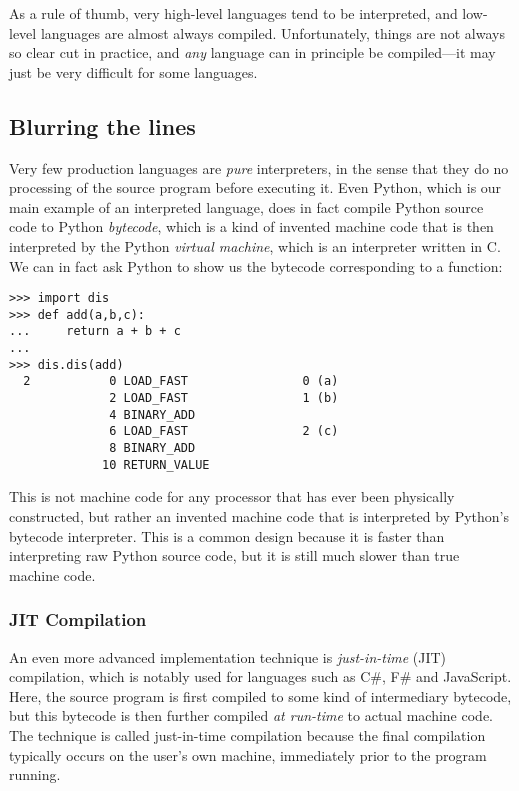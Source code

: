 As a rule of thumb, very high-level languages tend to be interpreted,
and low-level languages are almost always compiled.  Unfortunately,
things are not always so clear cut in practice, and \textit{any}
language can in principle be compiled---it may just be very difficult
for some languages.

\subsection{Blurring the lines}

Very few production languages are \textit{pure} interpreters, in the
sense that they do no processing of the source program before
executing it.  Even Python, which is our main example of an
interpreted language, does in fact compile Python source code to
Python \textit{bytecode}, which is a kind of invented machine code
that is then interpreted by the Python \textit{virtual machine}, which
is an interpreter written in C.  We can in fact ask Python to show us
the bytecode corresponding to a function:

\begin{lstlisting}
>>> import dis
>>> def add(a,b,c):
...     return a + b + c
...
>>> dis.dis(add)
  2           0 LOAD_FAST                0 (a)
              2 LOAD_FAST                1 (b)
              4 BINARY_ADD
              6 LOAD_FAST                2 (c)
              8 BINARY_ADD
             10 RETURN_VALUE
\end{lstlisting}

This is not machine code for any processor that has ever been
physically constructed, but rather an invented machine code that is
interpreted by Python's bytecode interpreter.  This is a common design
because it is faster than interpreting raw Python source code, but it
is still much slower than true machine code.

\subsubsection{JIT Compilation}

An even more advanced implementation technique is
\textit{just-in-time} (JIT) compilation, which is notably used for
languages such as C\#, F\# and JavaScript.  Here, the source program
is first compiled to some kind of intermediary bytecode, but this
bytecode is then further compiled \textit{at run-time} to actual
machine code.  The technique is called just-in-time compilation
because the final compilation typically occurs on the user's own
machine, immediately prior to the program running.

